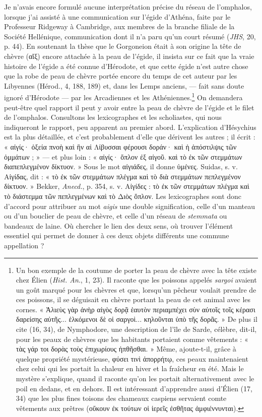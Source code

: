 \documentclass[a4paper, 11pt, oneside, polutonikogreek, french]{article}
\begin{document}
Je n'avais encore formulé aucune interprétation précise du réseau de l'omphalos, lorsque j'ai assisté à une communication sur l'égide d'Athéna, faite par le Professeur Ridgeway à Cambridge, aux membres de la branche filiale de la Société Hellénique, communication dont il n'a paru qu'un court résumé (\emph{JHS}, 20, p. 44). En soutenant la thèse que le Gorgoneion était à son origine la tête de chèvre (αἴξ) encore attachée à la peau de l'égide, il insista sur ce fait que la vraie histoire de l'égide a été connue d'Hérodote, et que cette égide n'est autre chose que la robe de peau de chèvre portée encore du temps de cet auteur par les Libyennes (Hérod., 4, 188, 189) et, dans les Lemps anciens, --- fait sans doute ignoré d'Hérodote --- par les Arcadiennes et les Athéniennes.\footnote{Un bon exemple de la coutume de porter la peau de chèvre avec la tête existe chez Élien (\emph{Hist. An}., 1, 23). Il raconte que les poissons appelés \emph{sargoi} avaient un goût marqué pour les chèvres et que, lorsqu'un pêcheur voulait prendre de ces poissons, il se déguisait en chèvre portant la peau de cet animal avec les cornes. « Ἁλιεὺς γὰρ ἀνὴρ αἰγὸς δορᾷ ἑαυτὸν περιαμπέχει σὺν αὐτοῖς τοῖς κέρασι δαρείσης αὐτῆς... ἑλκόμενοι δὲ οἱ σαργοὶ... κηλοῦνται ὑπὸ τῆς δορᾶς. » De plus il cite (16, 34), de Nymphodore, une description de l'île de Sarde, célèbre, dit-il, pour les peaux de chèvres que les habitants portaient comme vêtements : « τὰς γάρ τοι δορὰς τοὺς ἐπιχωρίους ἠπθῆσθαι. » Même, ajoute-t-il, grâce à quelque propriété mystérieuse, φύσει τινὶ ἀπορρήτῳ, ces peaux maintenaient chez celui qui les portait la chaleur en hiver et la fraîcheur en été. Mais le mystère s'explique, quand il raconte qu'on les portait alternativement avec le poil en dedans, et en dehors. Il est intéressant d'apprendre aussi d'Élien (17, 34) que les plus fines toisons des chameaux caspiens servaient comte vêtements aux prêtres (οὔκουν ἐκ τούτων οἱ ἱερεῖς ἐσθῆτας ἀμφιέννυνται).} On demandera peut-être quel rapport il peut y avoir entre la peau de chèvre de l'égide et le filet de l'omphalos. Consultons les lexicographes et les scholiastes, qui nous indiqueront le rapport, peu apparent au premier abord. L'explication d'Hésychius est la plus détaillée, et c'est probablement d'elle que dérivent les autres ; il écrit : « αἰγίς· ὀξεία πνοὴ καὶ ἣν αἱ Λίβυσσαι φέρουσι δοράν· καὶ ἡ ἀπόστιλψις τῶν ὀμμάτων ; » --- et plus loin : « αἰγίς· ὅπλον ἐξ αἰγοῦ. καὶ τὸ ἐκ τῶν στεμμάτων διαπεπλεγμένον δίκτυον. » Sous le mot αἰγιάδες, il donne ὑμένες. Suidas, s. v. Αἰγίδας, dit : « τὸ ἐκ τῶν στεμμάτων πλέγμα καὶ τὸ διὰ στεμμάτων πεπλεγμένον δίκτυον. » Bekker, \emph{Anecd.}, p. 354, s. v. Αἰγίδες : τὸ ἐκ τῶν στεμμάτων πλέγμα καὶ τὸ διάστεμμα τῶν πεπλεγμένων καὶ τὸ Διὸς ὅπλον. Les lexicographes sont donc d'accord pour attribuer au mot \emph{aigis} une double signification, celle d'un manteau ou d'un bouclier de peau de chèvre, et celle d'un réseau de \emph{stemmata} ou bandeaux de laine. Où chercher le lien des deux sens, où trouver l'élément essentiel qui permet de donner à ces deux objets différents une commune appellation ?
\end{document}
